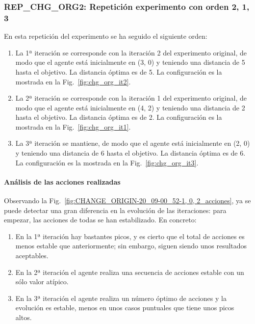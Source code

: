 \subsubsection{REP\_CHG\_ORG2: Repetición experimento con orden 2, 1, 3} \label{REP_CHG_ORG2}

En esta repetición del experimento se ha seguido el siguiente orden: 
\begin{enumerate}
    \item La 1ª iteración se corresponde con la iteración 2 del experimento original,  de modo que el agente está inicialmente en (3, 0) y teniendo una distancia de 5 hasta el objetivo. La distancia óptima es de 5. La configuración es la mostrada en la Fig.~\ref{fig:chg_org_it2}.
    \item La 2ª iteración se corresponde con la iteración 1 del experimento original, de modo que el agente está inicialmente en (4, 2) y teniendo una distancia de 2 hasta el objetivo. La distancia óptima es de 2. La configuración es la mostrada en la Fig.~\ref{fig:chg_org_it1}.
    \item La 3ª iteración se mantiene, de modo que el agente está inicialmente en (2, 0) y teniendo una distancia de 6 hasta el objetivo. La distancia óptima es de 6. La configuración es la mostrada en la Fig.~\ref{fig:chg_org_it3}.
\end{enumerate}

\paragraph{Análisis de las acciones realizadas}

Observando la Fig.~\ref{fig:CHANGE_ORIGIN-20_09-00_52-1, 0, 2_acciones}, ya se puede detectar una gran diferencia en la evolución de las iteraciones: para empezar, las acciones de todas se han estabilizado. En concreto:
\begin{enumerate}
    \item En la 1ª iteración hay bastantes picos, y es cierto que el total de acciones es menos estable que anteriormente; sin embargo, siguen siendo unos resultados aceptables. 
    \item En la 2ª iteración el agente realiza una secuencia de acciones estable con un sólo valor atípico.
    \item En la 3ª iteración el agente realiza un número óptimo de acciones y la evolución es estable, menos en unos casos puntuales que tiene unos picos altos. 
\end{enumerate}

